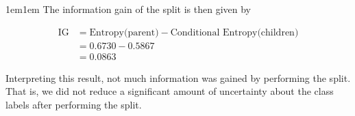 \documentclass[11pt]{article}
\begin{document}
\begin{adjustwidth}{1em}{1em}
        The information gain of the split is then given by 

        \begin{align*}
            \text{IG} &= \text{Entropy(parent)} - \text{Conditional Entropy(children)} \\ 
                      &= 0.6730 - 0.5867 \\ 
                      &= 0.0863
        \end{align*}

        Interpreting this result, not much information was gained by performing the split. That is,
        we did not reduce a significant amount of uncertainty about the class labels after
        performing the split.
    \end{adjustwidth}
\end{document}
